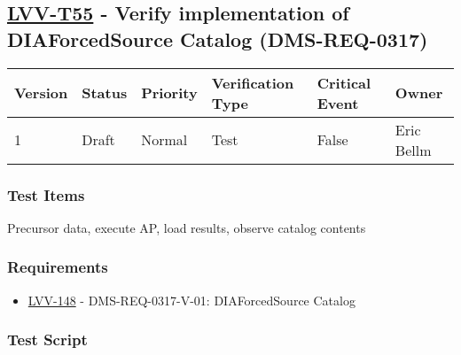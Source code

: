 \hypertarget{lvv-t55---verify-implementation-of-diaforcedsource-catalog-dms-req-0317}{%
\subsection{\texorpdfstring{\href{https://jira.lsstcorp.org/secure/Tests.jspa\#/testCase/LVV-T55}{LVV-T55}
- Verify implementation of DIAForcedSource Catalog
(DMS-REQ-0317)}{LVV-T55 - Verify implementation of DIAForcedSource Catalog (DMS-REQ-0317)}}\label{lvv-t55---verify-implementation-of-diaforcedsource-catalog-dms-req-0317}}

\begin{longtable}[]{@{}llllll@{}}
\toprule
Version & Status & Priority & Verification Type & Critical Event &
Owner\tabularnewline
\midrule
\endhead
1 & Draft & Normal & Test & False & Eric Bellm\tabularnewline
\bottomrule
\end{longtable}

\hypertarget{test-items-31}{%
\subsubsection{Test Items}\label{test-items-31}}

Precursor data, execute AP, load results, observe catalog contents

\hypertarget{requirements-32}{%
\subsubsection{Requirements}\label{requirements-32}}

\begin{itemize}
\tightlist
\item
  \href{https://jira.lsstcorp.org/browse/LVV-148}{LVV-148} -
  DMS-REQ-0317-V-01: DIAForcedSource Catalog
\end{itemize}

\hypertarget{test-script-32}{%
\subsubsection{Test Script}\label{test-script-32}}

